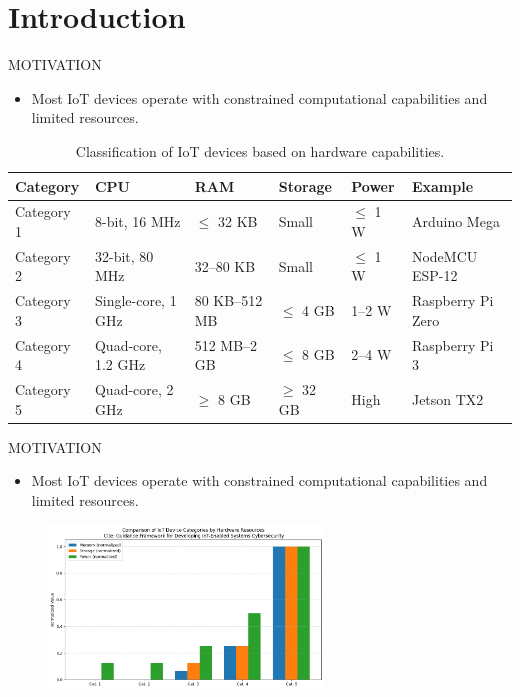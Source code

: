 \section{Introduction}

\begin{frame}{MOTIVATION}
    \begin{itemize}
        \item Most IoT devices operate with constrained computational capabilities and limited resources.
    \end{itemize}
    \begin{table}[ht]
    \scriptsize
    \caption{Classification of IoT devices based on hardware capabilities.}
    \begin{tabular}{@{}llllll@{}}
    \toprule
    \textbf{Category} & \textbf{CPU} & \textbf{RAM} & \textbf{Storage} & \textbf{Power} & \textbf{Example} \\ 
    \midrule
    Category 1 & 8-bit, 16 MHz & $\leq$ 32 KB & Small & $\leq$ 1 W & Arduino Mega \\
    Category 2 & 32-bit, 80 MHz & 32–80 KB & Small & $\leq$ 1 W & NodeMCU ESP-12 \\
    Category 3 & Single-core, 1 GHz & 80 KB–512 MB & $\leq$ 4 GB & 1–2 W & Raspberry Pi Zero \\
    Category 4 & Quad-core, 1.2 GHz & 512 MB–2 GB & $\leq$ 8 GB & 2–4 W & Raspberry Pi 3 \\
    Category 5 & Quad-core, 2 GHz & $\geq$ 8 GB & $\geq$ 32 GB & High & Jetson TX2 \\
    \bottomrule
    \end{tabular}
    \end{table}
\end{frame}

\begin{frame}{MOTIVATION}
    \vspace{0.5cm}
    \begin{itemize}
        \item Most IoT devices operate with constrained computational capabilities and limited resources.
    \end{itemize}
    \begin{figure}
        \centering
        \includegraphics[width=0.65\textwidth]{pic/cat.png}
    \end{figure}
\end{frame}

